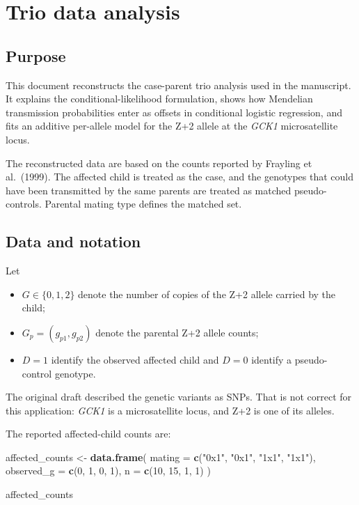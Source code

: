 \documentclass[
]{article}
\newenvironment{Shaded}{\begin{snugshade}}{\end{snugshade}}
\newcommand{\AttributeTok}[1]{\textcolor[rgb]{0.13,0.29,0.53}{#1}}
\newcommand{\DecValTok}[1]{\textcolor[rgb]{0.00,0.00,0.81}{#1}}
\newcommand{\FunctionTok}[1]{\textcolor[rgb]{0.13,0.29,0.53}{\textbf{#1}}}
\newcommand{\NormalTok}[1]{#1}
\newcommand{\OtherTok}[1]{\textcolor[rgb]{0.56,0.35,0.01}{#1}}
\newcommand{\StringTok}[1]{\textcolor[rgb]{0.31,0.60,0.02}{#1}}
\providecommand{\tightlist}{%
  \setlength{\itemsep}{0pt}\setlength{\parskip}{0pt}}
\begin{document}
\clearpage

\section{Trio data analysis}\label{trio-data-analysis}

\subsection{Purpose}\label{purpose}

This document reconstructs the case-parent trio analysis used in the
manuscript. It explains the conditional-likelihood formulation, shows
how Mendelian transmission probabilities enter as offsets in conditional
logistic regression, and fits an additive per-allele model for the Z+2
allele at the \textit{GCK1} microsatellite locus.

The reconstructed data are based on the counts reported by Frayling et
al.~(1999). The affected child is treated as the case, and the genotypes
that could have been transmitted by the same parents are treated as
matched pseudo-controls. Parental mating type defines the matched set.

\subsection{Data and notation}\label{data-and-notation}

Let

\begin{itemize}
\tightlist
\item
  \(G\in\{0,1,2\}\) denote the number of copies of the Z+2 allele
  carried by the child;
\item
  \(G_p=(g_{p1},g_{p2})\) denote the parental Z+2 allele counts;
\item
  \(D=1\) identify the observed affected child and \(D=0\) identify a
  pseudo-control genotype.
\end{itemize}

The original draft described the genetic variants as SNPs. That is not
correct for this application: \textit{GCK1} is a microsatellite locus,
and Z+2 is one of its alleles.

The reported affected-child counts are:

\begin{Shaded}
\begin{Highlighting}[]
\NormalTok{affected\_counts }\OtherTok{\textless{}{-}} \FunctionTok{data.frame}\NormalTok{(}
  \AttributeTok{mating =} \FunctionTok{c}\NormalTok{(}\StringTok{"0x1"}\NormalTok{, }\StringTok{"0x1"}\NormalTok{, }\StringTok{"1x1"}\NormalTok{, }\StringTok{"1x1"}\NormalTok{),}
  \AttributeTok{observed\_g =} \FunctionTok{c}\NormalTok{(}\DecValTok{0}\NormalTok{, }\DecValTok{1}\NormalTok{, }\DecValTok{0}\NormalTok{, }\DecValTok{1}\NormalTok{),}
  \AttributeTok{n =} \FunctionTok{c}\NormalTok{(}\DecValTok{10}\NormalTok{, }\DecValTok{15}\NormalTok{, }\DecValTok{1}\NormalTok{, }\DecValTok{1}\NormalTok{)}
\NormalTok{)}

\NormalTok{affected\_counts}
\end{Highlighting}
\end{Shaded}
\end{document}
